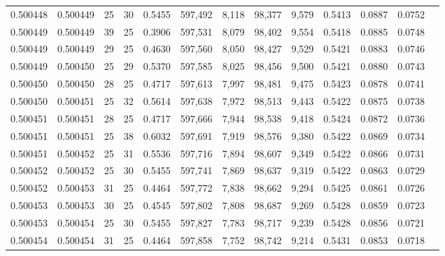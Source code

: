 \begin{tabular}{rrrrrrrrrrrrr}
0.500448 & 0.500449 &    25 &  30 &                                     0.5455 & 597,492 &   8,118 &  98,377 &   9,579 & 0.5413 & 0.0887 & 0.0752 \\
0.500449 & 0.500449 &    39 &  25 &                                     0.3906 & 597,531 &   8,079 &  98,402 &   9,554 & 0.5418 & 0.0885 & 0.0748 \\
0.500449 & 0.500449 &    29 &  25 &                                     0.4630 & 597,560 &   8,050 &  98,427 &   9,529 & 0.5421 & 0.0883 & 0.0746 \\
0.500449 & 0.500450 &    25 &  29 &                                     0.5370 & 597,585 &   8,025 &  98,456 &   9,500 & 0.5421 & 0.0880 & 0.0743 \\
0.500450 & 0.500450 &    28 &  25 &                                     0.4717 & 597,613 &   7,997 &  98,481 &   9,475 & 0.5423 & 0.0878 & 0.0741 \\
0.500450 & 0.500451 &    25 &  32 &                                     0.5614 & 597,638 &   7,972 &  98,513 &   9,443 & 0.5422 & 0.0875 & 0.0738 \\
0.500451 & 0.500451 &    28 &  25 &                                     0.4717 & 597,666 &   7,944 &  98,538 &   9,418 & 0.5424 & 0.0872 & 0.0736 \\
0.500451 & 0.500451 &    25 &  38 &                                     0.6032 & 597,691 &   7,919 &  98,576 &   9,380 & 0.5422 & 0.0869 & 0.0734 \\
0.500451 & 0.500452 &    25 &  31 &                                     0.5536 & 597,716 &   7,894 &  98,607 &   9,349 & 0.5422 & 0.0866 & 0.0731 \\
0.500452 & 0.500452 &    25 &  30 &                                     0.5455 & 597,741 &   7,869 &  98,637 &   9,319 & 0.5422 & 0.0863 & 0.0729 \\
0.500452 & 0.500453 &    31 &  25 &                                     0.4464 & 597,772 &   7,838 &  98,662 &   9,294 & 0.5425 & 0.0861 & 0.0726 \\
0.500453 & 0.500453 &    30 &  25 &                                     0.4545 & 597,802 &   7,808 &  98,687 &   9,269 & 0.5428 & 0.0859 & 0.0723 \\
0.500453 & 0.500454 &    25 &  30 &                                     0.5455 & 597,827 &   7,783 &  98,717 &   9,239 & 0.5428 & 0.0856 & 0.0721 \\
0.500454 & 0.500454 &    31 &  25 &                                     0.4464 & 597,858 &   7,752 &  98,742 &   9,214 & 0.5431 & 0.0853 & 0.0718 \\

\end{tabular}
